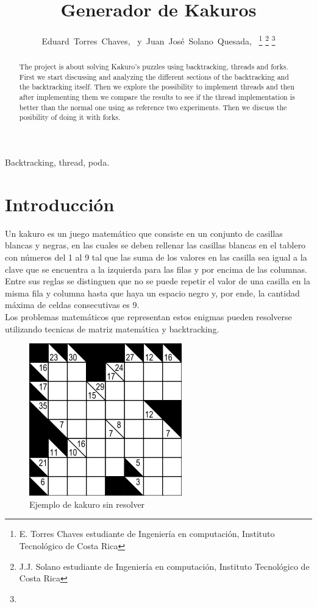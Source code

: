 \documentclass[journal]{IEEEtran}
\begin{document}
\title{Generador de Kakuros}
\author{Eduard~Torres~Chaves,~\IEEEmembership{}
        y~Juan~José~Solano~Quesada,~\IEEEmembership{}
\thanks{E. Torres Chaves estudiante de Ingeniería en computación, Instituto Tecnológico de Costa Rica}%
\thanks{J.J. Solano estudiante de Ingeniería en computación, Instituto Tecnológico de Costa Rica}%
\thanks{}}
\maketitle
\begin{abstract}
The project is about solving Kakuro's puzzles using backtracking, threads and forks. First we start discussing and analyzing the different sections of the backtracking and the backtracking itself. Then we explore the possibility to implement threads and then after implementing them we compare the results to see if the thread implementation is better than the normal one using as reference two experiments. Then we discuss the posibility of doing it with forks.

\end{abstract}
\begin{IEEEkeywords}
Backtracking, thread, poda.
\end{IEEEkeywords}
\IEEEpeerreviewmaketitle

\section{Introducción}
Un kakuro es un juego matemático que consiste en un conjunto de casillas blancas y negras, en las cuales se deben rellenar las casillas blancas en el tablero con números del 1 al 9 tal que las suma de los valores en las casilla sea igual a la clave que se encuentra a la izquierda para las filas y por encima de las columnas.\\
Entre sus reglas se distinguen que no se puede repetir el valor de una casilla en la misma fila y columna hasta que haya un espacio negro y, por ende, la cantidad máxima de celdas consecutivas es 9.\\
Los problemas matemáticos que representan estos enigmas pueden resolverse utilizando tecnicas de matriz matemática y backtracking.

\begin{figure}[h] 
        \centering \includegraphics[width=.35\columnwidth]{kakuro_blank.png}
        \caption{
                \label{fig:samplesetup}
                Ejemplo de kakuro sin resolver
        }
\end{figure}
\end{document}
